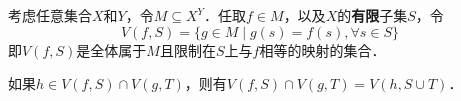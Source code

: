 考虑任意集合$X$和$Y$，令$M\subseteq X^Y$．任取$f\in M$，以及$X$的\textbf{有限}子集$S$，令
\begin{equation}
V(f, S) = \{g\in M\mid g(s)=f(s), \forall s\in S\}
\end{equation}
即$V(f, S)$是全体属于$M$且限制在$S$上与$f$相等的映射的集合．

如果$h\in V(f, S)\cap V(g, T)$，则有$V(f, S)\cap V(g, T) = V(h, S\cup T)$．




































